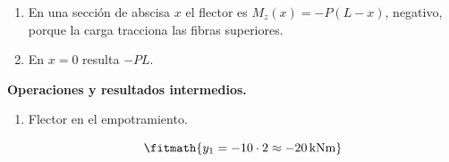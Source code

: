 \begin{enumerate}

\item En una sección de abscisa $x$ el flector es $M_z(x) = -P(L - x)$, negativo, porque la carga tracciona las fibras superiores.

\item En $x = 0$ resulta $-PL$.

\end{enumerate}

\noindent\textbf{Operaciones y resultados intermedios.}

\begin{enumerate}

\item Flector en el empotramiento.

\[\fitmath{y_{1}=-10\cdot 2\approx -20\,\mathrm{kN m}}\]

\end{enumerate}
